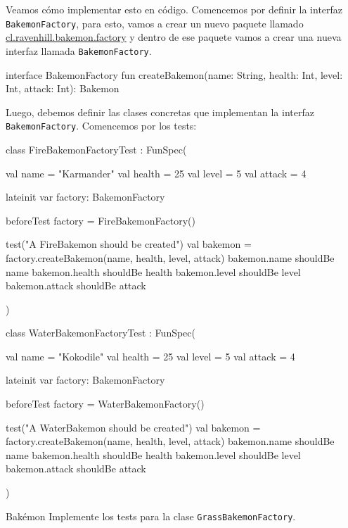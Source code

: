   Veamos cómo implementar esto en código.
  Comencemos por definir la interfaz \texttt{BakemonFactory}, para esto, vamos a crear un nuevo
  paquete llamado \url{cl.ravenhill.bakemon.factory} y dentro de ese paquete vamos a crear una nueva
  interfaz llamada \texttt{BakemonFactory}.  

  \begin{kotlin}
    interface BakemonFactory {
      fun createBakemon(name: String, health: Int, level: Int, attack: Int): Bakemon
    }
  \end{kotlin}

  Luego, debemos definir las clases concretas que implementan la interfaz \texttt{BakemonFactory}.
  Comencemos por los tests:

  \begin{kotlin}
    class FireBakemonFactoryTest : FunSpec({
      val name = "Karmander"
      val health = 25
      val level = 5
      val attack = 4
      
      lateinit var factory: BakemonFactory

      beforeTest {
        factory = FireBakemonFactory()
      }

      test("A FireBakemon should be created") {
        val bakemon = factory.createBakemon(name, health, level, attack)
        bakemon.name shouldBe name
        bakemon.health shouldBe health
        bakemon.level shouldBe level
        bakemon.attack shouldBe attack
      }
    })
  \end{kotlin}

  \begin{kotlin}
    class WaterBakemonFactoryTest : FunSpec({
      val name = "Kokodile"
      val health = 25
      val level = 5
      val attack = 4
      
      lateinit var factory: BakemonFactory

      beforeTest {
        factory = WaterBakemonFactory()
      }

      test("A WaterBakemon should be created") {
        val bakemon = factory.createBakemon(name, health, level, attack)
        bakemon.name shouldBe name
        bakemon.health shouldBe health
        bakemon.level shouldBe level
        bakemon.attack shouldBe attack
      }
    })
  \end{kotlin}

  \begin{ejercicio}{Bakémon}
    Implemente los tests para la clase \texttt{GrassBakemonFactory}.
  \end{ejercicio}
  

